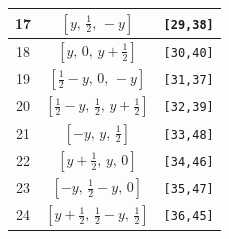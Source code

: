 \documentclass[fleqn,8pt]{jsarticle}
\begin{document}
\begin{longtable}{ccc}
17 & $\left[ y,\, \frac{1}{2},\, - y \right]$ & {\tt [29,38]} \\ \hline
18 & $\left[ y,\, 0,\, y + \frac{1}{2} \right]$ & {\tt [30,40]} \\ \hline
19 & $\left[ \frac{1}{2} - y,\, 0,\, - y \right]$ & {\tt [31,37]} \\ \hline
20 & $\left[ \frac{1}{2} - y,\, \frac{1}{2},\, y + \frac{1}{2} \right]$ & {\tt [32,39]} \\ \hline
21 & $\left[ - y,\, y,\, \frac{1}{2} \right]$ & {\tt [33,48]} \\ \hline
22 & $\left[ y + \frac{1}{2},\, y,\, 0 \right]$ & {\tt [34,46]} \\ \hline
23 & $\left[ - y,\, \frac{1}{2} - y,\, 0 \right]$ & {\tt [35,47]} \\ \hline
24 & $\left[ y + \frac{1}{2},\, \frac{1}{2} - y,\, \frac{1}{2} \right]$ & {\tt [36,45]} \\
\end{longtable}
\renewcommand{\arraystretch}{1.2}
\end{document}
